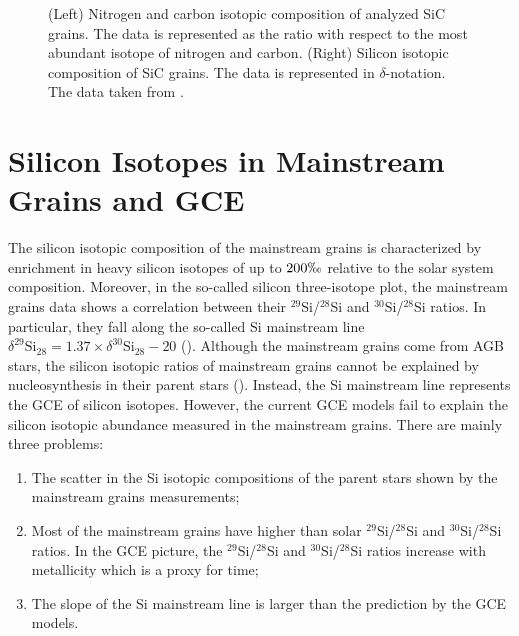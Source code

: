 \documentclass{brandeis-thesis3.2}
\newcommand{\iso}[2]{$^{#1}${#2}}
\newcommand{\del}[3]{\delta^{#1}\text{#3}_{#2}}
\begin{document}
\begin{figure}
\begin{subfigure}[b]{0.45\textwidth}
     \end{subfigure}
     \caption{(Left) Nitrogen and carbon isotopic composition of analyzed SiC grains. The data is represented as the ratio with respect to the most abundant isotope of nitrogen and carbon. (Right) Silicon isotopic composition of SiC grains. The data is represented in $\delta$-notation. The data taken from \cite{stephan_20}.}
     \label{fig:sic}
\end{figure}

\section{Silicon Isotopes in Mainstream Grains and GCE}
The silicon isotopic composition of the mainstream grains is characterized by enrichment in heavy silicon isotopes of up to $200\permil$ relative to the solar system composition. Moreover, in the so-called silicon three-isotope plot, the mainstream grains data shows a correlation between their \iso{29}{Si}/\iso{28}{Si} and \iso{30}{Si}/\iso{28}{Si} ratios. In particular, they fall along the so-called Si mainstream line $\del{29}{28}{Si} = 1.37 \times \del{30}{28}{Si} -20$ (\citealt{Zinner2007}). Although the mainstream grains come from AGB stars, the silicon isotopic ratios of mainstream grains cannot be explained by nucleosynthesis in their parent stars (\citealt{Lugaro1999}). Instead, the Si mainstream line represents the GCE of silicon isotopes. However, the current GCE models fail to explain the silicon isotopic abundance measured in the mainstream grains. There are mainly three problems:
\begin{enumerate}
    \item The scatter in the Si isotopic compositions of the parent stars shown by the mainstream grains measurements;
    \item Most of the mainstream grains have higher than solar \iso{29}{Si}/\iso{28}{Si} and \iso{30}{Si}/\iso{28}{Si} ratios. In the GCE picture, the \iso{29}{Si}/\iso{28}{Si} and \iso{30}{Si}/\iso{28}{Si} ratios increase with metallicity which is a proxy for time;
    \item The slope of the Si mainstream line is larger than the prediction by the GCE models.
\end{enumerate}
\end{document}

